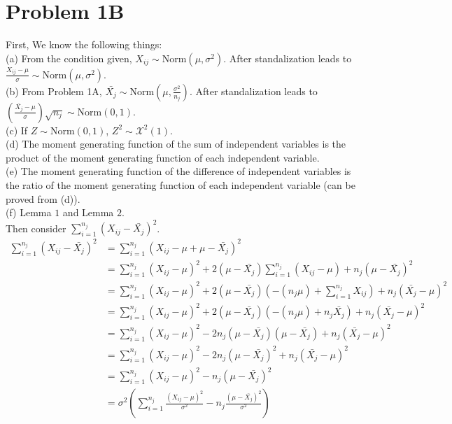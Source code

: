 \documentclass{article}
\begin{document}
\section*{Problem 1B}
First, We know the following things:\\
(a) From the condition given, $X_{ij} \sim \text{Norm}(\mu,\sigma^2)$. After standalization leads to $\frac{X_{ij}-\mu}{\sigma} \sim \text{Norm}(\mu,\sigma^2)$.\\
(b) From Problem 1A, $\bar{X_j} \sim \text{Norm}(\mu, \frac{\sigma^2}{n_j})$. After standalization leads to $(\frac{\bar{X_j}-\mu}{\sigma})\sqrt{n_j} \sim \text{Norm}(0,1)$.\\
(c) If $Z \sim \text{Norm}(0,1)$, $Z^2 \sim \mathcal{X}^2(1)$.\\
(d) The moment generating function of the sum of independent variables is the product of the moment generating function of each independent variable.\\
(e) The moment generating function of the difference of independent variables is the ratio of the moment generating function of each independent variable (can be proved from (d)).\\
(f) Lemma $1$ and Lemma $2$.\\


Then consider $\sum_{i=1}^{n_j} (X_{ij}-\bar{X_j})^2$.\\
 \begin{align*}
 \sum_{i=1}^{n_j} (X_{ij}-\bar{X_j})^2 &= \sum_{i=1}^{n_j} (X_{ij}-\mu+\mu -\bar{X_j})^2\\
 &= \sum_{i=1}^{n_j} (X_{ij}-\mu)^2+2(\mu -\bar{X_j})\sum_{i=1}^{n_j}(X_{ij}-\mu)+n_j(\mu -\bar{X_j})^2\\
 &= \sum_{i=1}^{n_j} (X_{ij}-\mu)^2+2(\mu -\bar{X_j})\left(-(n_j\mu)+\sum_{i=1}^{n_j}X_{ij}\right)+n_j(\bar{X_j}-\mu)^2\\
 &= \sum_{i=1}^{n_j} (X_{ij}-\mu)^2+2(\mu -\bar{X_j})\left(-(n_j\mu)+n_j\bar{X_{j}}\right)+n_j(\bar{X_j}-\mu)^2\\
 &= \sum_{i=1}^{n_j} (X_{ij}-\mu)^2-2n_j(\mu -\bar{X_j})(\mu - \bar{X_{j}})+n_j(\bar{X_j}-\mu)^2\\
 &= \sum_{i=1}^{n_j} (X_{ij}-\mu)^2-2n_j(\mu -\bar{X_j})^2+n_j(\bar{X_j}-\mu)^2\\
 &= \sum_{i=1}^{n_j} (X_{ij}-\mu)^2-n_j(\mu -\bar{X_j})^2\\
 &= \sigma^2\left(\sum_{i=1}^{n_j} \frac{(X_{ij}-\mu)^2}{\sigma^2}-n_j\frac{(\mu -\bar{X_j})^2}{\sigma^2}\right)\\
 \end{align*}
\end{document}
